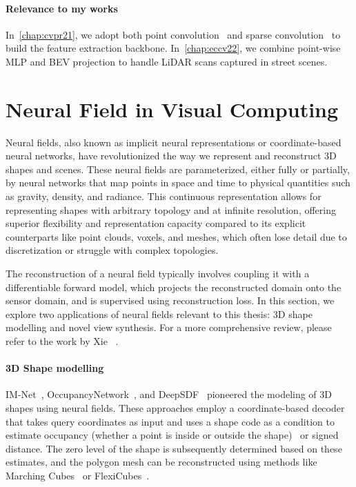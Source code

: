 \paragraph{Relevance to my works} In~\cref{chap:cvpr21}, we adopt both point convolution~\cite{thomas2019kpconv} and sparse convolution~\cite{choy2019Minkowski} to build the feature extraction backbone. In~\cref{chap:eccv22}, we combine point-wise MLP and BEV projection to handle LiDAR scans captured in street scenes. 


\section{Neural Field in Visual Computing}
\label{sec:bg_neural_field}
Neural fields, also known as implicit neural representations or coordinate-based neural networks, have revolutionized the way we represent and reconstruct 3D shapes and scenes. These neural fields are parameterized, either fully or partially, by neural networks that map points in space and time to physical quantities such as gravity, density, and radiance. This continuous representation allows for representing shapes with arbitrary topology and at infinite resolution, offering superior flexibility and representation capacity compared to its explicit counterparts like point clouds, voxels, and meshes, which often lose detail due to discretization or struggle with complex topologies.

The reconstruction of a neural field typically involves coupling it with a differentiable forward model, which projects the reconstructed domain onto the sensor domain, and is supervised using reconstruction loss. In this section, we explore two applications of neural fields relevant to this thesis: 3D shape modelling and novel view synthesis. For a more comprehensive review, please refer to the work by Xie \etal~\cite{xie2022neural}.

\paragraph{3D Shape modelling}
IM-Net~\cite{chen2019learning}, OccupancyNetwork~\cite{mescheder2019occupancy}, and DeepSDF~\cite{park2019deepsdf} pioneered the modeling of 3D shapes using neural fields. These approaches employ a coordinate-based decoder that takes query coordinates as input and uses a shape code as a condition to estimate occupancy (whether a point is inside or outside the shape)~\cite{mescheder2019occupancy, chen2019learning} or signed distance\cite{park2019deepsdf}. The zero level of the shape is subsequently determined based on these estimates, and the polygon mesh can be reconstructed using methods like Marching Cubes~\cite{levoy1990efficient} or FlexiCubes~\cite{shen2023flexible}.

